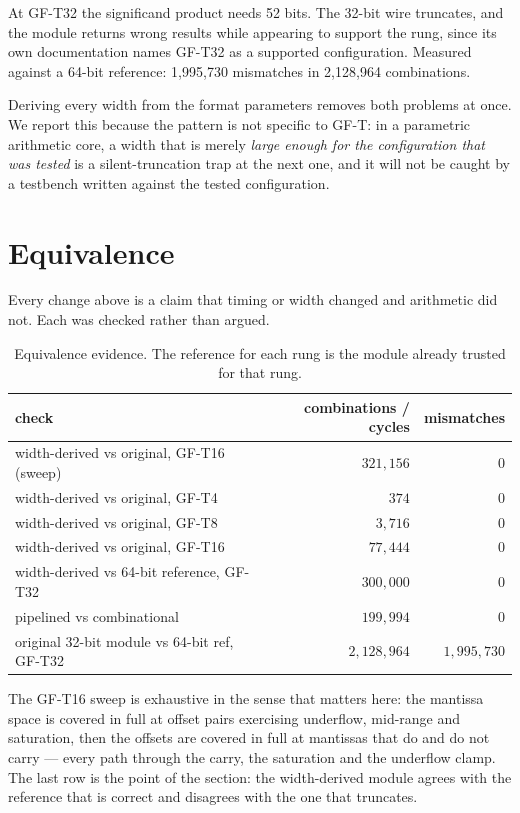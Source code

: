 \documentclass[11pt]{article}
\theoremstyle{definition}
\begin{document}
At GF-T32 the significand product needs 52 bits. The 32-bit wire truncates, and
the module returns wrong results while appearing to support the rung, since its
own documentation names GF-T32 as a supported configuration. Measured against a
64-bit reference: 1{,}995{,}730 mismatches in 2{,}128{,}964 combinations.

Deriving every width from the format parameters removes both problems at once. We
report this because the pattern is not specific to GF-T: in a parametric
arithmetic core, a width that is merely \emph{large enough for the configuration
that was tested} is a silent-truncation trap at the next one, and it will not be
caught by a testbench written against the tested configuration.

\section{Equivalence}\label{sec:equiv}

Every change above is a claim that timing or width changed and arithmetic did
not. Each was checked rather than argued.

\begin{table}[t]\centering
\caption{Equivalence evidence. The reference for each rung is the module already
trusted for that rung.}
\label{tab:equiv}
\begin{tabular}{lrr}
\toprule
check & combinations / cycles & mismatches \\
\midrule
width-derived vs original, GF-T16 (sweep)      & $321{,}156$   & $0$ \\
width-derived vs original, GF-T4               & $374$         & $0$ \\
width-derived vs original, GF-T8               & $3{,}716$     & $0$ \\
width-derived vs original, GF-T16              & $77{,}444$    & $0$ \\
width-derived vs 64-bit reference, GF-T32      & $300{,}000$   & $0$ \\
pipelined vs combinational                     & $199{,}994$   & $0$ \\
\midrule
original 32-bit module vs 64-bit ref, GF-T32   & $2{,}128{,}964$ & $1{,}995{,}730$ \\
\bottomrule
\end{tabular}
\end{table}

The GF-T16 sweep is exhaustive in the sense that matters here: the mantissa space
is covered in full at offset pairs exercising underflow, mid-range and
saturation, then the offsets are covered in full at mantissas that do and do not
carry --- every path through the carry, the saturation and the underflow clamp.
The last row is the point of the section: the width-derived module agrees with
the reference that is correct and disagrees with the one that truncates.
\end{document}
